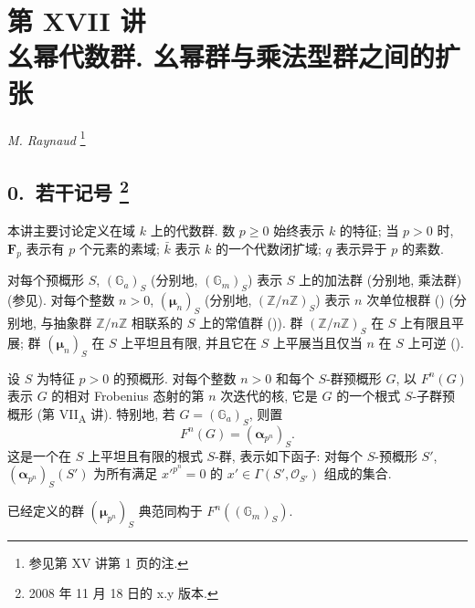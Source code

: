 \chapter*{第 XVII 讲\\[0.4em]
幺幂代数群. 幺幂群与乘法型群之间的扩张}
\begin{center}
\textit{M. Raynaud}%
\begingroup
\renewcommand{\thefootnote}{*}%
\footnote{参见第 XV 讲第 1 页的注.}%
\endgroup
\end{center}
\section*{0.\ 若干记号%
\begingroup
\renewcommand{\thefootnote}{0}%
\footnote{2008 年 11 月 18 日的 x.y 版本.}%
\endgroup}

本讲主要讨论定义在域 \(k\) 上的代数群. 数 \(p\geq 0\) 始终表示 \(k\) 的特征;
当 \(p>0\) 时, \(\mathbf F_p\) 表示有 \(p\) 个元素的素域;
\(\bar{k}\) 表示 \(k\) 的一个代数闭扩域; \(q\) 表示异于 \(p\) 的素数.

对每个预概形 \(S\), \((\mathbb G_a)_S\) (分别地, \((\mathbb G_m)_S\))
表示 \(S\) 上的加法群 (分别地, 乘法群)
(参见). 对每个整数 \(n>0\),
\((\boldsymbol\mu_n)_S\) (分别地, \((\mathbb Z/n\mathbb Z)_S\))
表示 \(n\) 次单位根群 ()
(分别地, 与抽象群 \(\mathbb Z/n\mathbb Z\) 相联系的 \(S\) 上的常值群
()). 群 \((\mathbb Z/n\mathbb Z)_S\)
在 \(S\) 上有限且平展; 群 \((\boldsymbol\mu_n)_S\) 在 \(S\) 上平坦且有限,
并且它在 \(S\) 上平展当且仅当 \(n\) 在 \(S\) 上可逆
().

设 \(S\) 为特征 \(p>0\) 的预概形. 对每个整数 \(n>0\) 和每个 \(S\)-群预概形 \(G\),
以 \(F^n(G)\) 表示 \(G\) 的相对 Frobenius 态射的第 \(n\) 次迭代的核,
它是 \(G\) 的一个根式 \(S\)-子群预概形 (第 VII\textsubscript{A} 讲).
特别地, 若 \(G=(\mathbb G_a)_S\), 则置
\[
  F^n(G)=(\boldsymbol\alpha_{p^n})_S .
\]
这是一个在 \(S\) 上平坦且有限的根式 \(S\)-群, 表示如下函子:
对每个 \(S\)-预概形 \(S'\), \((\boldsymbol\alpha_{p^n})_S(S')\)
为所有满足 \(x'^{p^n}=0\) 的 \(x'\in\Gamma(S',\mathcal O_{S'})\) 组成的集合.

已经定义的群 \((\boldsymbol\mu_{p^n})_S\) 典范同构于 \(F^n((\mathbb G_m)_S)\).

